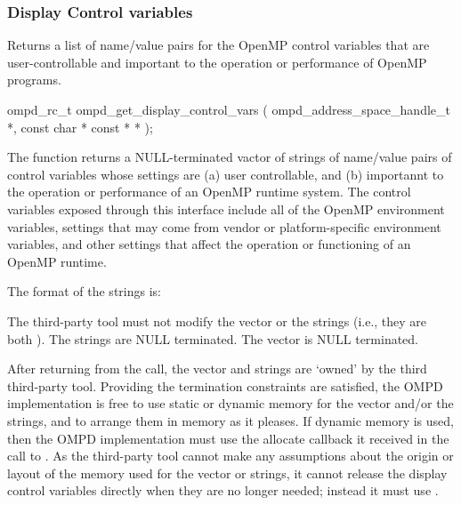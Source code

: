\subsubsection{Display Control variables}

\label{subsubsubsec:ompd_get_display_control_vars}
\summary
Returns a list of name/value pairs for the OpenMP control variables
that are user-controllable and important to the operation or
performance of OpenMP programs.
\format
\begin{cspecific}
\begin{ompSyntax}
ompd_rc_t ompd_get_display_control_vars (
  ompd_address_space_handle_t *,
  const char * const * *
);
\end{ompSyntax}
\end{cspecific}

\descr
The function  returns a
NULL-terminated vactor of strings of name/value pairs of control
variables whose settings are (a) user controllable,
and (b) importannt to the operation or performance of an OpenMP
runtime system.
The control variables exposed through this interface include all
of the OpenMP environment variables, settings that may come from
vendor or platform-specific environment variables, and other
settings that affect the operation or functioning of an OpenMP
runtime.

The format of the strings is:
\begin{center}
\end{center}

The third-party tool must not modify the vector or the strings
(i.e., they are both ).
The strings are NULL terminated.
The vector is NULL terminated.

After returning from the call, the vector and strings are `owned'
by the third third-party tool.
Providing the termination constraints are satisfied, the OMPD
implementation is free to use static or dynamic memory for the
vector and/or the strings, and to arrange them in memory
as it pleases.
If dynamic memory is used, then the OMPD implementation must use
the allocate callback it received in the call to .
As the third-party tool cannot make any assumptions about the origin or
layout of the memory used for the vector or strings, it cannot release
the display control variables directly when they are no longer
needed; instead it must use .

